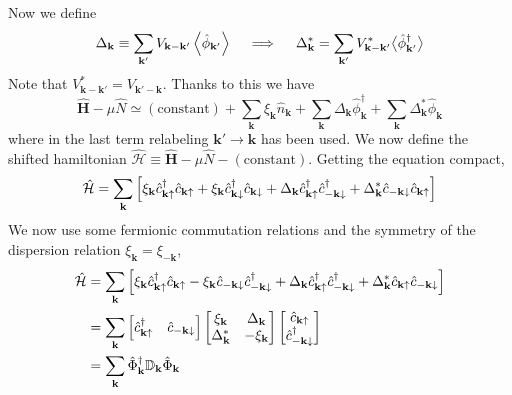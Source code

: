 Now we define
\[
	\Delta_\mathbf{k} \equiv \sum_{\mathbf{k}'} V_{\mathbf{k}-\mathbf{k}'} \ev{\hat{\phi}_{\mathbf{k}'}}
	\quad\implies\quad
	\Delta_\mathbf{k}^* = \sum_{\mathbf{k}'} V_{\mathbf{k}-\mathbf{k}'}^* \big\langle\hat{\phi}_{\mathbf{k}'}^\dagger\big\rangle
\]
Note that $V_{\mathbf{k}-\mathbf{k}'}^* = V_{\mathbf{k}'-\mathbf{k}}$. Thanks to this we have
\[
	\hat{\bm H} - \mu\hat{N} \simeq (\mathrm{constant}) + \sum_{\mathbf{k}} \xi_{\mathbf{k}} \hat n_\mathbf{k} + 
	\sum_\mathbf{k} \Delta_\mathbf{k} \hat{\phi}_\mathbf{k}^\dagger + \sum_\mathbf{k} \Delta_\mathbf{k}^* \hat{\phi}_\mathbf{k}
\]
where in the last term relabeling $\mathbf{k}' \to \mathbf{k}$ has been used. We now define the shifted hamiltonian $\hat{\mathcal{H}} \equiv \hat{\bm H} - \mu\hat{N} - (\mathrm{constant})$. Getting the equation compact,
\[
	\hat{\mathcal{H}} = \sum_\mathbf{k} \left[{\xi_\mathbf{k} \hat{c}_{\mathbf{k}\uparrow}^\dagger \hat{c}_{\mathbf{k}\uparrow} + \xi_\mathbf{k} \hat{c}_{\mathbf{k}\downarrow}^\dagger \hat{c}_{\mathbf{k}\downarrow} + \Delta_\mathbf{k} \hat{c}_{\mathbf{k}\uparrow}^\dagger \hat{c}_{-\mathbf{k}\downarrow}^\dagger + \Delta_\mathbf{k}^*	 \hat{c}_{-\mathbf{k}\downarrow} \hat{c}_{\mathbf{k}\uparrow} }\right]
\]
We now use some fermionic commutation relations and the symmetry of the dispersion relation $\xi_\mathbf{k} = \xi_{-\mathbf{k}}$,
\[
\begin{aligned}
	\hat{\mathcal{H}} &= \sum_\mathbf{k} \left[{\xi_\mathbf{k} \hat{c}_{\mathbf{k}\uparrow}^\dagger \hat{c}_{\mathbf{k}\uparrow} - \xi_\mathbf{k}
	\hat{c}_{-\mathbf{k}\downarrow} \hat{c}_{-\mathbf{k}\downarrow}^\dagger + \Delta_\mathbf{k} \hat{c}_{\mathbf{k}\uparrow}^\dagger \hat{c}_{-\mathbf{k}\downarrow}^\dagger + \Delta_\mathbf{k}^* \hat{c}_{\mathbf{k}\uparrow} \hat{c}_{-\mathbf{k}\downarrow} }\right] \\
	&= \sum_\mathbf{k} \begin{bmatrix}
		\hat{c}_{\mathbf{k}\uparrow}^\dagger & \hat{c}_{-\mathbf{k}\downarrow}
	\end{bmatrix} \begin{bmatrix}
		\xi_\mathbf{k} & \Delta_\mathbf{k} \\
		\Delta_\mathbf{k}^* & - \xi_\mathbf{k}
	\end{bmatrix} \begin{bmatrix}
		\hat{c}_{\mathbf{k}\uparrow} \\
		\hat{c}_{-\mathbf{k}\downarrow}^\dagger
	\end{bmatrix} \\
	&= \sum_\mathbf{k} \hat{\Phi}_\mathbf{k}^\dagger \mathbb{D}_\mathbf{k} \hat{\Phi}_\mathbf{k}
\end{aligned}
\]
